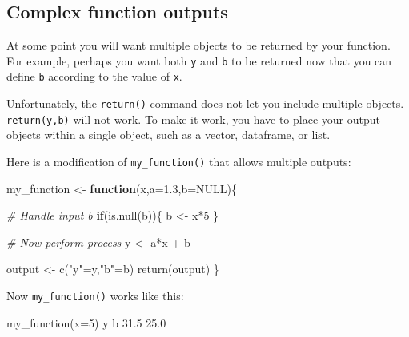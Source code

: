 \documentclass[
]{book}
\newenvironment{Shaded}{\begin{snugshade}}{\end{snugshade}}
\newcommand{\AttributeTok}[1]{\textcolor[rgb]{0.77,0.63,0.00}{#1}}
\newcommand{\CommentTok}[1]{\textcolor[rgb]{0.56,0.35,0.01}{\textit{#1}}}
\newcommand{\ConstantTok}[1]{\textcolor[rgb]{0.00,0.00,0.00}{#1}}
\newcommand{\ControlFlowTok}[1]{\textcolor[rgb]{0.13,0.29,0.53}{\textbf{#1}}}
\newcommand{\DecValTok}[1]{\textcolor[rgb]{0.00,0.00,0.81}{#1}}
\newcommand{\FloatTok}[1]{\textcolor[rgb]{0.00,0.00,0.81}{#1}}
\newcommand{\FunctionTok}[1]{\textcolor[rgb]{0.00,0.00,0.00}{#1}}
\newcommand{\NormalTok}[1]{#1}
\newcommand{\OtherTok}[1]{\textcolor[rgb]{0.56,0.35,0.01}{#1}}
\newcommand{\SpecialCharTok}[1]{\textcolor[rgb]{0.00,0.00,0.00}{#1}}
\newcommand{\StringTok}[1]{\textcolor[rgb]{0.31,0.60,0.02}{#1}}
\begin{document}
\hypertarget{complex-function-outputs}{%
\subsection*{Complex function outputs}\label{complex-function-outputs}}

At some point you will want multiple objects to be returned by your function. For example, perhaps you want both \texttt{y} and \texttt{b} to be returned now that you can define \texttt{b} according to the value of \texttt{x}.

Unfortunately, the \texttt{return()} command does not let you include multiple objects. \texttt{return(y,b)} will not work. To make it work, you have to place your output objects within a single object, such as a vector, dataframe, or list.

Here is a modification of \texttt{my\_function()} that allows multiple outputs:

\begin{Shaded}
\begin{Highlighting}[]
\NormalTok{my\_function }\OtherTok{\textless{}{-}} \ControlFlowTok{function}\NormalTok{(x,}\AttributeTok{a=}\FloatTok{1.3}\NormalTok{,}\AttributeTok{b=}\ConstantTok{NULL}\NormalTok{)\{}
  
  \CommentTok{\# Handle input \textasciigrave{}b\textasciigrave{}}
  \ControlFlowTok{if}\NormalTok{(}\FunctionTok{is.null}\NormalTok{(b))\{}
\NormalTok{    b }\OtherTok{\textless{}{-}}\NormalTok{ x}\SpecialCharTok{*}\DecValTok{5}
\NormalTok{  \}}
  
  \CommentTok{\# Now perform process}
\NormalTok{  y }\OtherTok{\textless{}{-}}\NormalTok{ a}\SpecialCharTok{*}\NormalTok{x }\SpecialCharTok{+}\NormalTok{ b}
  
\NormalTok{  output }\OtherTok{\textless{}{-}} \FunctionTok{c}\NormalTok{(}\StringTok{"y"}\OtherTok{=}\NormalTok{y,}\StringTok{"b"}\OtherTok{=}\NormalTok{b) }
  \FunctionTok{return}\NormalTok{(output)}
\NormalTok{\}}
\end{Highlighting}
\end{Shaded}

Now \texttt{my\_function()} works like this:

\begin{Shaded}
\begin{Highlighting}[]
\FunctionTok{my\_function}\NormalTok{(}\AttributeTok{x=}\DecValTok{5}\NormalTok{)}
\NormalTok{   y    b }
\FloatTok{31.5} \FloatTok{25.0} 
\end{Highlighting}
\end{Shaded}
\end{document}
